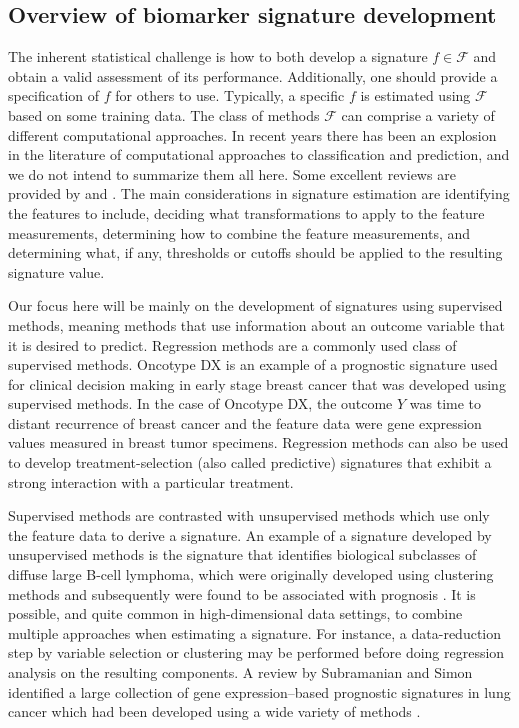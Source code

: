 \documentclass[11pt,]{article}
\begin{document}
\subsection{Overview of biomarker signature
development}\label{overview-of-biomarker-signature-development}

The inherent statistical challenge is how to both develop a signature
\(f \in \mathcal{F}\) and obtain a valid assessment of its performance.
Additionally, one should provide a specification of \(f\) for others to
use. Typically, a specific \(f\) is estimated using \(\mathcal{F}\)
based on some training data. The class of methods \(\mathcal{F}\) can
comprise a variety of different computational approaches. In recent
years there has been an explosion in the literature of computational
approaches to classification and prediction, and we do not intend to
summarize them all here. Some excellent reviews are provided by
\citet{hastie2009elements} and \citet{moons2012riskI}. The main
considerations in signature estimation are identifying the features to
include, deciding what transformations to apply to the feature
measurements, determining how to combine the feature measurements, and
determining what, if any, thresholds or cutoffs should be applied to the
resulting signature value.

Our focus here will be mainly on the development of signatures using
supervised methods, meaning methods that use information about an
outcome variable that it is desired to predict. Regression methods are a
commonly used class of supervised methods. Oncotype DX
\citep{paik2004multigene} is an example of a prognostic signature used
for clinical decision making in early stage breast cancer that was
developed using supervised methods. In the case of Oncotype DX, the
outcome \(Y\) was time to distant recurrence of breast cancer and the
feature data were gene expression values measured in breast tumor
specimens. Regression methods can also be used to develop
treatment-selection (also called predictive) signatures that exhibit a
strong interaction with a particular treatment.

Supervised methods are contrasted with unsupervised methods which use
only the feature data to derive a signature. An example of a signature
developed by unsupervised methods is the signature that identifies
biological subclasses of diffuse large B-cell lymphoma, which were
originally developed using clustering methods and subsequently were
found to be associated with prognosis \citep{alizadeh2000distinct}. It
is possible, and quite common in high-dimensional data settings, to
combine multiple approaches when estimating a signature. For instance, a
data-reduction step by variable selection or clustering may be performed
before doing regression analysis on the resulting components. A review
by Subramanian and Simon identified a large collection of gene
expression--based prognostic signatures in lung cancer which had been
developed using a wide variety of methods \citep{subramanian2010gene}.
\end{document}
